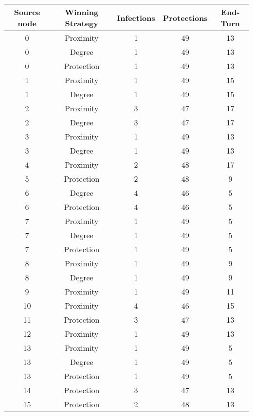 \documentclass[results.tex]{subfiles}
\begin{document}
\begin{center}
  \begin{tabular}{| c || c | c | c | c |}
    \hline
    {\bfseries Source node} & {\bfseries Winning Strategy} & {\bfseries Infections} & {\bfseries Protections} & {\bfseries End-Turn} \\  %
    \hline\hline
    0 & Proximity & 1 & 49 & 13 \\ 
    \hline
    0 & Degree & 1 & 49 & 13 \\ 
    \hline
    0 & Protection & 1 & 49 & 13 \\ 
    \hline
    1 & Proximity & 1 & 49 & 15 \\ 
    \hline
    1 & Degree & 1 & 49 & 15 \\ 
    \hline
    2 & Proximity & 3 & 47 & 17 \\ 
    \hline
    2 & Degree & 3 & 47 & 17 \\ 
    \hline
    3 & Proximity & 1 & 49 & 13 \\ 
    \hline
    3 & Degree & 1 & 49 & 13 \\ 
    \hline
    4 & Proximity & 2 & 48 & 17 \\ 
    \hline
    5 & Protection & 2 & 48 & 9 \\ 
    \hline
    6 & Degree & 4 & 46 & 5 \\ 
    \hline
    6 & Protection & 4 & 46 & 5 \\ 
    \hline
    7 & Proximity & 1 & 49 & 5 \\ 
    \hline
    7 & Degree & 1 & 49 & 5 \\ 
    \hline
    7 & Protection & 1 & 49 & 5 \\ 
    \hline
    8 & Proximity & 1 & 49 & 9 \\ 
    \hline
    8 & Degree & 1 & 49 & 9 \\ 
    \hline
    9 & Proximity & 1 & 49 & 11 \\ 
    \hline
    10 & Proximity & 4 & 46 & 15 \\ 
    \hline
    11 & Protection & 3 & 47 & 13 \\ 
    \hline
    12 & Proximity & 1 & 49 & 13 \\ 
    \hline
    13 & Proximity & 1 & 49 & 5 \\ 
    \hline
    13 & Degree & 1 & 49 & 5 \\ 
    \hline
    13 & Protection & 1 & 49 & 5 \\ 
    \hline
    14 & Protection & 3 & 47 & 13 \\ 
    \hline
    15 & Protection & 2 & 48 & 13 \\ 

\end{tabular}
\end{center}
\end{document}
